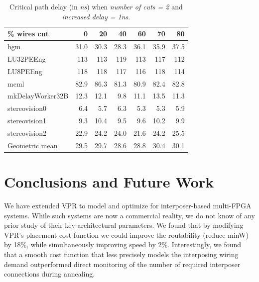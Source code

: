 \documentclass{sig-alternate-2013}
\begin{document}
\begin{table}[!htbp]
\begin{tabular}{|l|r|r|r|r|r|r|}
\hline
\% wires cut & 0 & 20 & 40 & 60 & 70 & 80 \\ \hline \hline
bgm & 31.0 & 30.3 & 28.3 & 36.1 & 35.9 & 37.5 \\ \hline
LU32PEEng & 113 & 113 & 119 & 113 & 117 & 112 \\ \hline
LU8PEEng & 118 & 118 & 117 & 116 & 118 & 114 \\ \hline
mcml & 82.9 & 86.3 & 81.3 & 80.9 & 82.4 & 82.8 \\ \hline
mkDelayWorker32B & 12.3 & 12.1 & 9.8 & 11.1 & 13.5 & 11.3 \\ \hline
stereovision0 & 6.4 & 5.7 & 6.3 & 5.3 & 5.3 & 5.9 \\ \hline
stereovision1 & 9.3 & 10.4 & 9.5 & 9.6 & 10.2 & 9.9 \\ \hline
stereovision2 & 22.9 & 24.2 & 24.0 & 21.6 & 24.2 & 25.5 \\ \hline
Geometric mean & 29.5 & 29.7 & 28.6 & 28.8 & 30.4 & 30.1 \\ \hline
\end{tabular}
\caption{Critical path delay (in \textit{ns}) when \textit{number of cuts = 2} and \textit{increased delay = 1ns}.}
\label{table:2cut_path}
\end{table}

\section{Conclusions and Future Work}
\label{conclusionSection}

We have extended VPR to model and optimize for interposer-based multi-FPGA systems. While such systems are now a commercial reality, we do not know of any prior study of their key architectural parameters. We found that by modifying VPR's placement cost function we could improve the routability (reduce minW) by 18\%, while simultaneously improving speed by 2\%. Interestingly, we found that a smooth cost function that less precisely models the interposing wiring demand outperformed direct monitoring of the number of required interposer connections during annealing.
\end{document}

